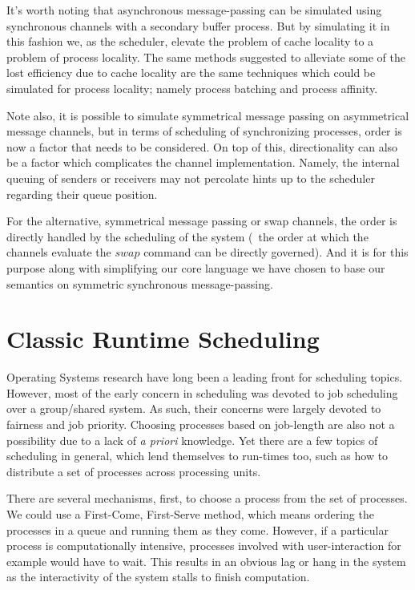 It's worth noting that asynchronous message-passing can be simulated using 
synchronous channels with a secondary buffer process. But by simulating it in 
this fashion we, as the scheduler, elevate the problem of cache locality to a
problem of process locality. The same methods suggested to alleviate some of the 
lost efficiency due to cache locality \cite{markatos1991load,markatos1991memory}
are the same techniques which could be simulated for process locality; namely
process batching and process affinity.

Note also, it is possible to simulate symmetrical message passing on asymmetrical 
message channels, but in terms of scheduling of synchronizing processes, order 
is now a factor that needs to be considered. On top of this, directionality can 
also be a factor which complicates the channel implementation. Namely, the 
internal queuing of senders or receivers may not percolate hints up to the 
scheduler regarding their queue position. 

For the alternative, symmetrical message passing or swap channels, the order is 
directly handled by the scheduling of the system (\ie~the order at which the 
channels evaluate the $swap$ command can be directly governed). And it is for 
this purpose along with simplifying our core language we have chosen to base our
semantics on symmetric synchronous message-passing. 

\section{Classic Runtime Scheduling}

Operating Systems research have long been a leading front for scheduling topics. 
However, most of the early concern in scheduling was devoted to job scheduling 
over a group/shared system. As such, their concerns were largely devoted to 
fairness and job priority. Choosing processes based on job-length are also not
a possibility due to a lack of {\sl a priori} knowledge. Yet there are a few 
topics of scheduling in general, which lend themselves to run-times too, such as 
how to distribute a set of processes across processing units.

There are several mechanisms, first, to choose a process from the set of 
processes. We could use a First-Come, First-Serve method, which means ordering 
the processes in a queue and running them as they come. However, if a particular
process is computationally intensive, processes involved with user-interaction 
for example would have to wait. This results in an obvious lag or hang in the 
system as the interactivity of the system stalls to finish computation. 

